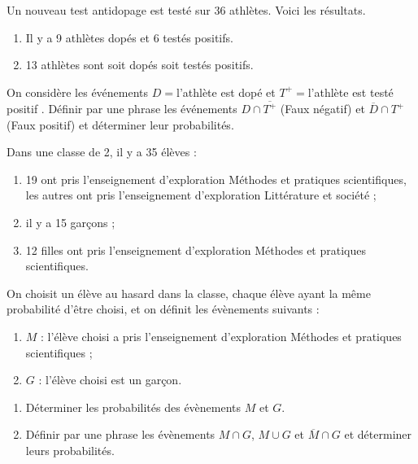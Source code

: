 \documentclass[main.tex]{subfiles}
\begin{document}
\vspace{-0.5em}
\begin{exercise}\label{chapitre09.ex.dopage} 
	Un nouveau test antidopage est testé sur 36 athlètes. Voici les résultats.
	\begin{enumerate}[label={\textbullet},leftmargin=*]
		\item Il y a 9 athlètes dopés et 6 testés positifs.
		\item 13 athlètes sont soit dopés soit testés positifs.
	\end{enumerate}
	On considère les événements $D=$\og l'athlète est dopé \fg{} et $T^+=$\og l'athlète est testé positif \fg{}. 
Définir par une phrase les événements $D\cap \overline{T^+}$ (Faux négatif) et $\overline{D}\cap T^+$ (Faux positif) et déterminer leur probabilités.  
\end{exercise} 
\begin{exercise}\label{evaluation:probabilite:exercice:01} 
	
	\medskip 
	
	\noindent Dans une classe de 2, il y a 35 élèves :
	\begin{enumerate}[label={\textbullet},leftmargin=*]
		\item 19 ont pris l'enseignement d'exploration \og Méthodes et pratiques scientifiques\fg{}, les autres ont pris l'enseignement d'exploration \og Littérature et société \fg{} ;
		\item il y a 15 garçons ;
		\item 12 filles ont pris l'enseignement d'exploration \og Méthodes et pratiques scientifiques\fg{}.
	\end{enumerate}
	
	\noindent On choisit un élève au hasard dans la classe, chaque élève ayant la même probabilité d'être choisi,
	et on définit les évènements suivants :
	\begin{enumerate}[label={\textbullet},leftmargin=*]
		\item $M$ : l'élève choisi a pris l'enseignement d'exploration \og Méthodes et pratiques scientifiques\fg{} ;
		\item $G$ : l'élève choisi est un garçon.
	\end{enumerate}
	
	\begin{enumerate}[label={\arabic*)},leftmargin=*]
		\item Déterminer les probabilités des  évènements $M$ et $G$.
		\item Définir par une phrase les évènements $M\cap G$, $M \cup G$ et   $\overline{M} \cap G$ et déterminer leurs probabilités.
	\end{enumerate}
	
\end{exercise}
\end{document}
